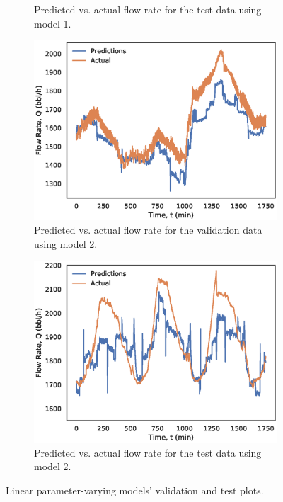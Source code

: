 \begin{figure}[h]
\begin{subfigure}[b]{0.48\textwidth}
         \caption{Predicted vs. actual flow rate for the test data using model 1.}
         \label{fig:08cluster1_test}
     \end{subfigure}
     \begin{subfigure}[b]{0.48\textwidth}
         \includegraphics[width=\textwidth]{images/08cluster2_valid.eps}
         \caption{Predicted vs. actual flow rate for the validation data using model 2.}
         \label{fig:08cluster2_valid}
     \end{subfigure}
     \begin{subfigure}[b]{0.48\textwidth}
         \includegraphics[width=\textwidth]{images/08cluster2_test.eps}
         \caption{Predicted vs. actual flow rate for the test data using model 2.}
         \label{fig:08cluster2_test}
     \end{subfigure}
        \caption{Linear parameter-varying models' validation and test plots.}
        \label{fig:08PolynomialPlots}
\end{figure}

